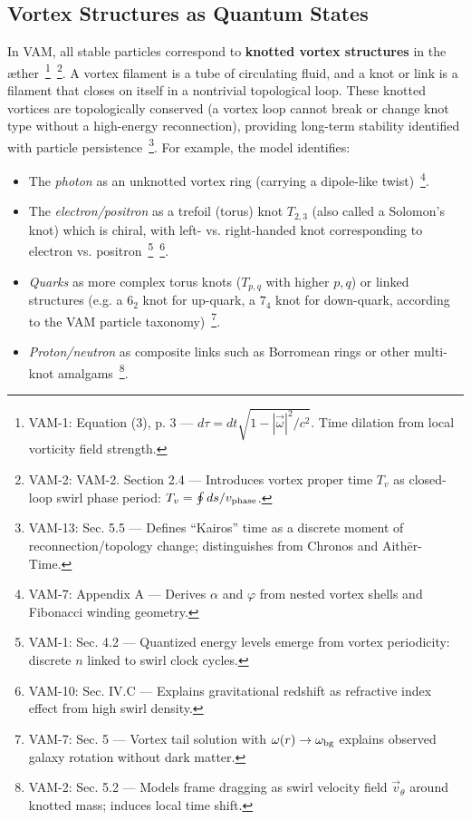 \documentclass[a4paper,12pt]{article}
\begin{document}
    \subsection{Vortex Structures as Quantum States}
    In VAM, all stable particles correspond to \textbf{knotted vortex structures} in the æther~\footnote{VAM-1: Equation (3), p. 3 — $d\tau = dt \sqrt{1 - |\vec{\omega}|^2/c^2}$. Time dilation from local vorticity field strength.}~\footnote{VAM-2: VAM-2. Section 2.4 — Introduces vortex proper time $T_v$ as closed-loop swirl phase period: $T_v = \oint ds / v_{\rm phase}$.}. A vortex filament is a tube of circulating fluid, and a knot or link is a filament that closes on itself in a nontrivial topological loop. These knotted vortices are topologically conserved (a vortex loop cannot break or change knot type without a high-energy reconnection), providing long-term stability identified with particle persistence~\footnote{VAM-13: Sec. 5.5 — Defines “Kairos” time as a discrete moment of reconnection/topology change; distinguishes from Chronos and Aithēr-Time.}. For example, the model identifies:
    \begin{itemize}
        \item The \emph{photon} as an unknotted vortex ring (carrying a dipole-like twist)~\footnote{VAM-7: Appendix A — Derives $\alpha$ and $\varphi$ from nested vortex shells and Fibonacci winding geometry.}.
        \item The \emph{electron/positron} as a trefoil (torus) knot $T_{2,3}$ (also called a Solomon’s knot) which is chiral, with left- vs. right-handed knot corresponding to electron vs. positron~\footnote{VAM-1: Sec. 4.2 — Quantized energy levels emerge from vortex periodicity: discrete $n$ linked to swirl clock cycles.}~\footnote{VAM-10: Sec. IV.C — Explains gravitational redshift as refractive index effect from high swirl density.}.
        \item \emph{Quarks} as more complex torus knots ($T_{p,q}$ with higher $p,q$) or linked structures (e.g. a $6_2$ knot for up-quark, a $7_4$ knot for down-quark, according to the VAM particle taxonomy)~\footnote{VAM-7: Sec. 5 — Vortex tail solution with $\omega(r) \to \omega_{\rm bg}$ explains observed galaxy rotation without dark matter.}.
        \item \emph{Proton/neutron} as composite links such as Borromean rings or other multi-knot amalgams~\footnote{VAM-2: Sec. 5.2 — Models frame dragging as swirl velocity field $\vec{v}_\theta$ around knotted mass; induces local time shift.}.
    \end{itemize}
\end{document}

